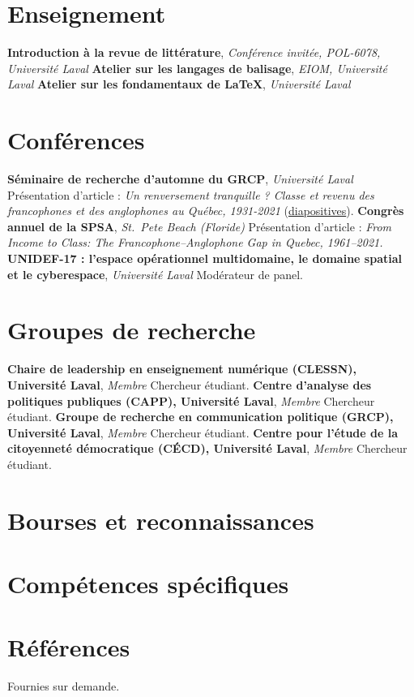 \documentclass[10pt,letterpaper]{article}
\begin{document}
\section*{Enseignement}
  {\textbf{Introduction à la revue de littérature}, \textit{Conférence invitée, POL-6078, Université Laval}}{}
  {\textbf{Atelier sur les langages de balisage}, \textit{EIOM, Université Laval}}{}
  {\textbf{Atelier sur les fondamentaux de LaTeX}, \textit{Université Laval}}{}

\section*{Conférences}
  {\textbf{Séminaire de recherche d'automne du GRCP}, \textit{Université Laval}}
  {Présentation d'article : \textit{Un renversement tranquille ? Classe et revenu des francophones et des anglophones au Québec, 1931-2021} (\href{https://www.masdupuis.com/presentation_grcp_2026/presentation.html}{diapositives}).}
  {\textbf{Congrès annuel de la SPSA}, \textit{St.\ Pete Beach (Floride)}}
  {Présentation d'article : \foreignlanguage{english}{\textit{From Income to Class: The Francophone--Anglophone Gap in Quebec, 1961--2021.}}}
  {\textbf{UNIDEF-17 : l'espace opérationnel multidomaine, le domaine spatial et le cyberespace}, \textit{Université Laval}}
  {Modérateur de panel.}

\section*{Groupes de recherche}
  {\textbf{Chaire de leadership en enseignement numérique (CLESSN), Université Laval}, \textit{Membre}}
  {Chercheur étudiant.}
  {\textbf{Centre d'analyse des politiques publiques (CAPP), Université Laval}, \textit{Membre}}
  {Chercheur étudiant.}
  {\textbf{Groupe de recherche en communication politique (GRCP), Université Laval}, \textit{Membre}}
  {Chercheur étudiant.}
  {\textbf{Centre pour l'étude de la citoyenneté démocratique (CÉCD), Université Laval}, \textit{Membre}}
  {Chercheur étudiant.}

\section*{Bourses et reconnaissances}

\section*{Compétences spécifiques}

\section*{Références}
Fournies sur demande.
\end{document}
